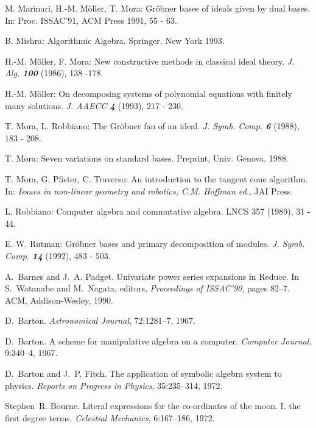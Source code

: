 \begin{thebibliography}{999}
 M. Marinari, H.-M. M\"oller, T. Mora: Gr\"obner bases of
ideals given by dual bases. In: Proc. ISSAC'91, ACM Press 1991, 55 -
63.

 B. Mishra: Algorithmic Algebra. Springer, New York
1993.

 H.-M. M\"oller, F. Mora: New constructive methods in
classical ideal theory. \textit{J. Alg. \textbf{100}} (1986), 138 -178.

 H.-M. M\"oller: On decomposing systems of polynomial
equations with finitely many solutions. \emph{J. AAECC \textbf{4}} (1993),
217 - 230.  

 T. Mora, L. Robbiano: The Gr\"obner fan of an ideal.
\textit{J. Symb. Comp. \textbf{6}} (1988), 183 - 208.

 T. Mora: Seven variations on standard bases. 
Preprint, Univ. Genova, 1988.

 T. Mora, G. Pfister, C. Traverso: An introduction to
the tangent cone algorithm. In: \emph{Issues in non-linear geometry and 
robotics, C.M. Hoffman ed.}, JAI Press.

 L. Robbiano: Computer algebra and commutative algebra.
LNCS 357 (1989), 31 - 44.

 E. W. Rutman: Gr\"obner bases and primary decomposition of
modules. \textit{J. Symb. Comp. \textbf{14}} (1992), 483 - 503.



A.~Barnes and J.~A. Padget.
\newblock Univariate power series expansions in {Reduce}.
\newblock In S.~Watanabe and M.~Nagata, editors, \emph{Proceedings of ISSAC'90},
  pages 82--7. ACM, Addison-Wesley, 1990.

D.~Barton.
\newblock \emph{Astronomical Journal}, 72:1281--7, 1967.

D.~Barton.
\newblock A scheme for manipulative algebra on a computer.
\newblock \emph{Computer Journal}, 9:340--4, 1967.

D.~Barton and J.~P. Fitch.
\newblock The application of symbolic algebra system to physics.
\newblock \emph{Reports on Progress in Physics}, 35:235--314, 1972.

Stephen~R. Bourne.
\newblock Literal expressions for the co-ordinates of the moon. {I}. the first
  degree terms.
\newblock \emph{Celestial Mechanics}, 6:167--186, 1972.


\end{thebibliography}
